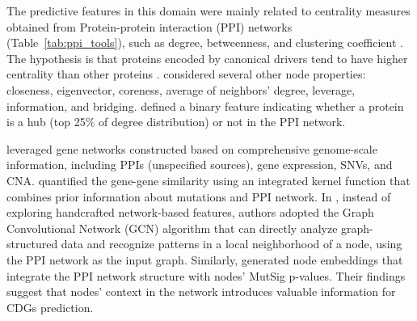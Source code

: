 The predictive features in this domain were mainly related to centrality measures obtained from Protein-protein interaction (PPI) networks (Table~\ref{tab:ppi_tools}), such as degree, betweenness, and clustering coefficient \cite{Tokheim2016, Zhou2018, Colaprico2020, Cutigi2020, Nulsen2021}. The hypothesis is that proteins encoded by canonical drivers tend to have higher centrality than other proteins \cite{Nulsen2021}. \citet{Cutigi2020} considered several other node properties: closeness, eigenvector, coreness, average of neighbors' degree, leverage, information, and bridging. 
\citet{Nulsen2021} defined a binary feature indicating whether a protein is a hub (\ie top 25\% of degree distribution) or not in the PPI network. 

\begin{table}[!t]
\caption{Protein-protein interaction (PPI) networks adopted by selected papers \label{tab:ppi_tools}}
\centering
{}
\end{table}

\citet{Park2015} leveraged gene networks constructed based on comprehensive genome-scale information, including PPIs (unspecified sources), gene expression, SNVs, and CNA. \citet{Collier2019} quantified the gene-gene similarity using an integrated kernel function that combines prior information about mutations and PPI network. In \citet{Schulte-Sasse2019}, instead of exploring handcrafted network-based features, authors adopted the Graph Convolutional Network (GCN) algorithm that can directly analyze graph-structured data and recognize patterns in a local neighborhood of a node, using the PPI network as the input graph. Similarly, \citet{Gumpinger2020} generated node embeddings that integrate the PPI network structure with nodes' MutSig p-values. Their findings suggest that nodes' context in the network introduces valuable information for CDGs prediction.


